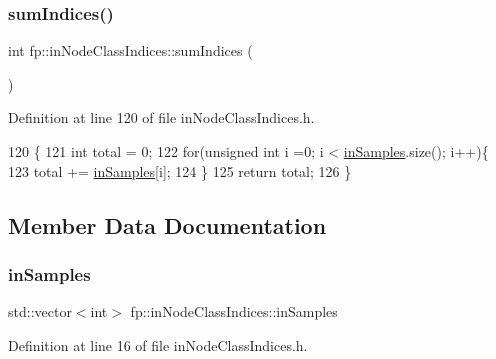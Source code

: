 \subsubsection{\texorpdfstring{sum\+Indices()}{sumIndices()}}
{\footnotesize\ttfamily int fp\+::in\+Node\+Class\+Indices\+::sum\+Indices (\begin{DoxyParamCaption}{ }\end{DoxyParamCaption})\hspace{0.3cm}{\ttfamily [inline]}}



Definition at line 120 of file in\+Node\+Class\+Indices.\+h.


\begin{DoxyCode}
120                                    \{
121                 \textcolor{keywordtype}{int} total = 0;
122                 \textcolor{keywordflow}{for}(\textcolor{keywordtype}{unsigned} \textcolor{keywordtype}{int} i =0; i < \hyperlink{classfp_1_1inNodeClassIndices_ae830eec1ee5490f4fe4fb3d579ac78eb}{inSamples}.size(); i++)\{
123                     total += \hyperlink{classfp_1_1inNodeClassIndices_ae830eec1ee5490f4fe4fb3d579ac78eb}{inSamples}[i];
124                 \}
125                 \textcolor{keywordflow}{return} total;
126             \}
\end{DoxyCode}


\subsection{Member Data Documentation}
\mbox{\label{classfp_1_1inNodeClassIndices_ae830eec1ee5490f4fe4fb3d579ac78eb}} 
\subsubsection{\texorpdfstring{in\+Samples}{inSamples}}
{\footnotesize\ttfamily std\+::vector$<$int$>$ fp\+::in\+Node\+Class\+Indices\+::in\+Samples\hspace{0.3cm}{\ttfamily [private]}}



Definition at line 16 of file in\+Node\+Class\+Indices.\+h.

\mbox{\label{classfp_1_1inNodeClassIndices_afaa76dfa346ba9de197b1cbd7a1557f9}} 
